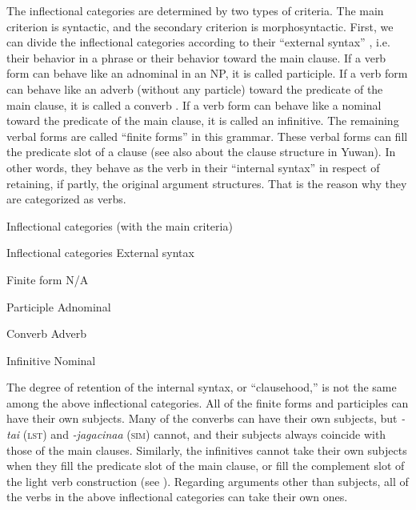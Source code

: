   The inflectional categories are determined by two types of criteria. The main criterion is syntactic, and the secondary criterion is morphosyntactic. First, we can divide the inflectional categories according to their “external syntax” \citep{Haspelmath1996}, i.e. their behavior in a phrase or their behavior toward the main clause. If a verb form can behave like an adnominal in an NP, it is called participle. If a verb form can behave like an adverb (without any particle) toward the predicate of the main clause, it is called a converb \citep{Haspelmath1995}. If a verb form can behave like a nominal toward the predicate of the main clause, it is called an infinitive. The remaining verbal forms are called “finite forms” in this grammar. These verbal forms can fill the predicate slot of a clause (see also  about the clause structure in Yuwan). In other words, they behave as the verb in their “internal syntax” \citep{Haspelmath1996} in respect of retaining, if partly, the original argument structures. That is the reason why they are categorized as verbs.

\begin{table}
\caption{\label{tab:key:77}Inflectional categories (with the main criteria)}

Inflectional categories  External syntax

Finite form  N/A

Participle  Adnominal

Converb  Adverb

Infinitive  Nominal
\end{table}

The degree of retention of the internal syntax, or “clausehood,” is not the same among the above inflectional categories. All of the finite forms and participles can have their own subjects. Many of the converbs can have their own subjects, but \textit{-tai} (\textsc{lst}) and \textit{-jagacinaa} (\textsc{sim}) cannot, and their subjects always coincide with those of the main clauses. Similarly, the infinitives cannot take their own subjects when they fill the predicate slot of the main clause, or fill the complement slot of the light verb construction (see ). Regarding arguments other than subjects, all of the verbs in the above inflectional categories can take their own ones.

